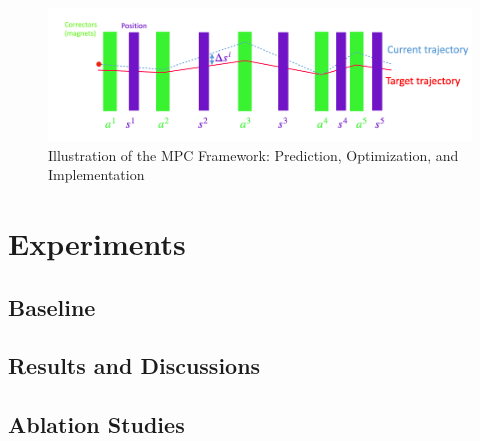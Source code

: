 \documentclass[journal,article,submit,pdftex,moreauthors]{Definitions/mdpi}
\begin{document}
\begin{figure}[h!]
	\centering
	\includegraphics[width=\textwidth]{Figures/AWAKE_steering_image.png}
	\caption{Illustration of the MPC Framework: Prediction, Optimization, and Implementation}
	\label{fig:MPC_diagram}
\end{figure}


\section{Experiments}
\subsection{Baseline}
\subsection{Results and Discussions}
\subsection{Ablation Studies}


\end{document}

